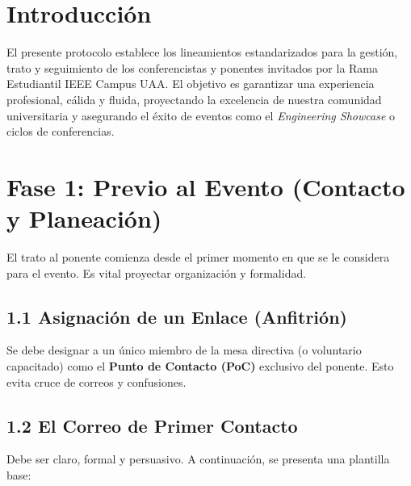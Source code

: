 \documentclass[11pt,a4paper]{article}
\begin{document}

\section{Introducción}
El presente protocolo establece los lineamientos estandarizados para la gestión, trato y seguimiento de los conferencistas y ponentes invitados por la Rama Estudiantil IEEE Campus UAA. El objetivo es garantizar una experiencia profesional, cálida y fluida, proyectando la excelencia de nuestra comunidad universitaria y asegurando el éxito de eventos como el \textit{Engineering Showcase} o ciclos de conferencias.
\newpage
\section{Fase 1: Previo al Evento (Contacto y Planeación)}

El trato al ponente comienza desde el primer momento en que se le considera para el evento. Es vital proyectar organización y formalidad.

\subsection{1.1 Asignación de un Enlace (Anfitrión)}
Se debe designar a un único miembro de la mesa directiva (o voluntario capacitado) como el \textbf{Punto de Contacto (PoC)} exclusivo del ponente. Esto evita cruce de correos y confusiones.

\subsection{1.2 El Correo de Primer Contacto}
Debe ser claro, formal y persuasivo. A continuación, se presenta una plantilla base:
\end{document}
